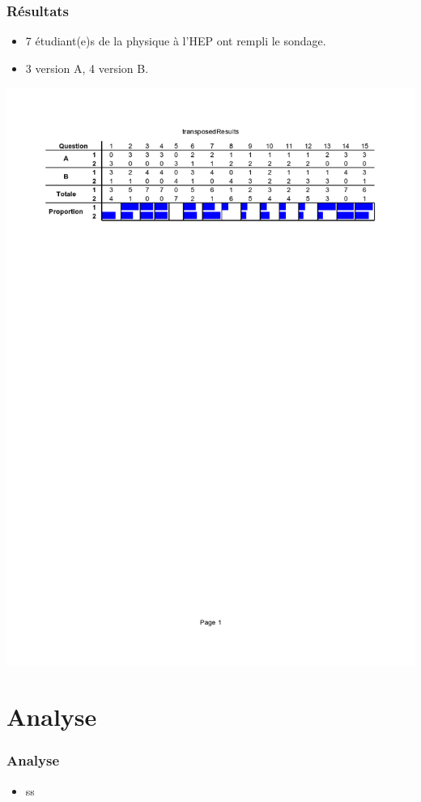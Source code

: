 \documentclass{beamer}
\begin{document}
\begin{frame}
  \frametitle{Résultats}
  \begin{itemize}
  \item 7 étudiant(e)s de la physique à l'HEP ont rempli le sondage.
    \item 3 version A, 4 version B.
    \end{itemize}

  \begin{center}
\hspace*{-1.5cm}\includegraphics[scale=0.5]{transposedResults}%
\end{center}
  \end{frame}


\section{Analyse}
\begin{frame}
  \frametitle{Analyse}
  \begin{itemize}
  \item   ss
  \end{itemize}
\end{frame}
\end{document}

